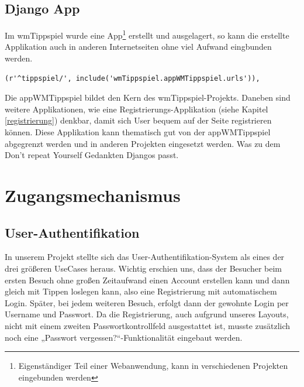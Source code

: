 \section{Django App}
Im wmTippspiel wurde eine App\footnote{Eigenständiger Teil einer Webanwendung,
kann in verschiedenen Projekten eingebunden werden} erstellt und ausgelagert, so
kann die erstellte Applikation auch in anderen Internetseiten ohne viel Aufwand 
eingbunden werden.

\begin{lstlisting}
(r'^tippspiel/', include('wmTippspiel.appWMTippspiel.urls')),
\end{lstlisting}

Die appWMTippspiel bildet den Kern des wmTippspiel-Projekts. Daneben sind
weitere Applikationen, wie eine Registrierungs-Applikation
(siehe Kapitel \ref{registrierung}) denkbar, damit sich User bequem auf der
Seite registrieren können. Diese Applikation kann thematisch gut von der 
appWMTippspiel abgegrenzt werden und in anderen Projekten eingesetzt werden. 
Was zu dem Don't repeat Yourself Gedankten Djangos passt.

\chapter{Zugangsmechanismus}
\section{User-Authentifikation}
In unserem Projekt stellte sich das User-Authentifikation-System als eines der
drei größeren UseCases heraus. Wichtig erschien uns, dass der Besucher beim 
ersten Besuch ohne großen Zeitaufwand einen Account erstellen kann und dann 
gleich mit Tippen loslegen kann, also eine Registrierung mit automatischem 
Login. Später, bei jedem weiteren Besuch, erfolgt dann der gewohnte Login per 
Username und Passwort. Da die Registrierung, auch aufgrund unseres Layouts, 
nicht mit einem zweiten Passwortkontrollfeld ausgestattet ist, musste
zusätzlich noch eine „Passwort vergessen?“-Funktionalität eingebaut werden.

